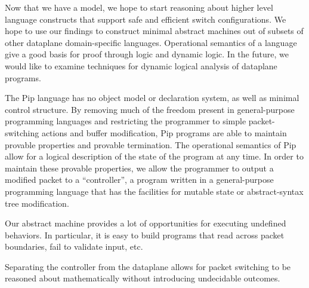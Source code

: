 Now that we have a model, we hope to start reasoning about higher level language constructs that support safe and efficient switch configurations. We hope to use our findings to construct minimal abstract machines out of subsets of other dataplane domain-specific languages. Operational semantics of a language give a good basis for proof through logic and dynamic logic. In the future, we would like to examine techniques for dynamic logical analysis of dataplane programs.


The Pip language has no object model or declaration system, as well as minimal control structure. By removing much of the freedom present in general-purpose programming languages and restricting the programmer to simple packet-switching actions and buffer modification, Pip programs are able to maintain provable properties and provable termination. The operational semantics of Pip allow for a logical description of the state of the program at any time. In order to maintain these provable properties, we allow the programmer to output a modified packet to a ``controller'', a program written in a general-purpose programming language that has the facilities for mutable state or abstract-syntax tree modification.


Our abstract machine provides a lot of opportunities for executing undefined behaviors. In particular, it is easy to build programs that read across packet boundaries, fail to validate input, etc. 

Separating the controller from the dataplane allows for packet switching to be reasoned about mathematically without introducing undecidable outcomes.


